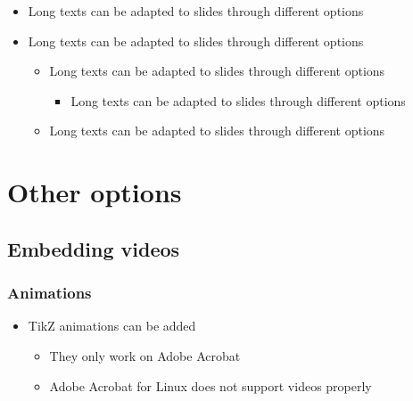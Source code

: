 \documentclass[usepdftitle=false,professionalfonts,compress ]{beamer}
\begin{document}
{\begin{frame}
\begin{itemize}
\begin{itemize}
				\end{itemize}

			\item Long texts can be adapted to slides through different options

			\item Long texts can be adapted to slides through different options


	\begin{itemize}

	\item Long texts can be adapted to slides through different options


	\begin{itemize}

	\item Long texts can be adapted to slides through different options

				\end{itemize}

			\item Long texts can be adapted to slides through different options

				\end{itemize}

				\end{itemize}

\end{frame}
}
















\section{Other options}
		
\subsection{Embedding videos}

{
\begin{frame}\frametitle{Animations}


	\begin{itemize}

	\item TikZ animations can be added


	\begin{itemize}

	\item They only work on Adobe Acrobat

			\item Adobe Acrobat for Linux does not support videos properly

				\end{itemize}

				\end{itemize}

\end{frame}
}
\end{document}

